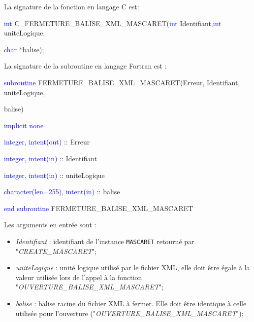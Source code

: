 \documentclass[a4paper,11pt]{article}
\begin{document}
 \vspace{0.5cm}
 
 La signature de la fonction en langage C est:
 
 \vspace{0.5cm}
 
 \textcolor{blue}{int} C\_FERMETURE\_BALISE\_XML\_MASCARET(\textcolor{blue}{int} Identifiant,\textcolor{blue}{int} uniteLogique,
 
 \textcolor{blue}{char} *balise);
 
 \vspace{0.5cm}
 
 La signature de la subroutine en langage Fortran est :
 
 \vspace{0.5cm}
 
    \textcolor{blue}{subroutine} FERMETURE\_BALISE\_XML\_MASCARET(Erreur, Identifiant, uniteLogique,
    
     balise)
    
        \hspace{1cm}\textcolor{blue}{implicit none}                 
        
        \hspace{1cm} \textcolor{blue}{integer, intent(out)} :: Erreur
        
        \hspace{1cm} \textcolor{blue}{integer, intent(in)} :: Identifiant
        
        \hspace{1cm} \textcolor{blue}{integer, intent(in)} :: uniteLogique
        
        \hspace{1cm} \textcolor{blue}{character(len=255), intent(in)} :: balise
        
    \textcolor{blue}{end subroutine} FERMETURE\_BALISE\_XML\_MASCARET
    
 \vspace{0.5cm}
 
 Les arguments en entr\'ee sont :
 
 \vspace{0.5cm}
 
 \begin{itemize}
 
    \item \textit{Identifiant} : identifiant de l'instance \texttt{MASCARET} retourn\'e par "\textit{CREATE\_MASCARET}";
    
    \vspace{0.5cm}
    
    \item \textit{uniteLogique} : unit\'e logique utilis\'e par le fichier XML, elle doit \^etre \'egale \`a la valeur utilis\'ee lors de l'appel \`a la fonction "\textit{OUVERTURE\_BALISE\_XML\_MASCARET}";
    
    \vspace{0.5cm}
    
    \item \textit{balise} : balise racine du fichier XML \`a fermer. Elle doit \^etre identique \`a celle utilis\'ee pour l'ouverture ("\textit{OUVERTURE\_BALISE\_XML\_MASCARET}");
    
 \end{itemize}
 
\end{document}
